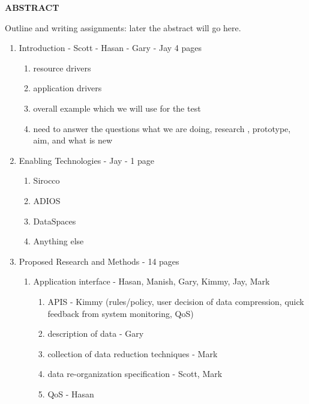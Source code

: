 \vspace{-\belowdisplayskip}
\vspace{-\abovedisplayskip}
\medskip

\begin{center}
\textbf{ABSTRACT}
\end{center}

\vspace{-\belowdisplayskip}

\enlargethispage{2\baselineskip}

\noindent
Outline and writing assignments:
later the abstract will go here.
\begin{enumerate}
\item Introduction - Scott - Hasan - Gary - Jay 4 pages
   \begin{enumerate}
      \item resource drivers
      \item application drivers
      \item overall example which we will use for the test
      \item  need to answer the questions what we are doing, research  , prototype, aim, and what is new
   \end{enumerate}
\item Enabling Technologies - Jay - 1 page
   \begin{enumerate}
   	\item Sirocco
   	\item ADIOS
   	\item DataSpaces
   	\item Anything else
   \end{enumerate}
 \item {Proposed Research and Methods} - 14 pages
    \begin{enumerate}
       \item Application interface - Hasan, Manish, Gary, Kimmy, Jay, Mark
          \begin{enumerate}
            \item APIS - Kimmy  (rules/policy, user decision of data compression, quick feedback from system monitoring, QoS)
            \item description of data - Gary
            \item collection of data reduction techniques - Mark
            \item data re-organization specification - Scott, Mark
            \item QoS - Hasan

\end{enumerate}
\end{enumerate}
\end{enumerate}
